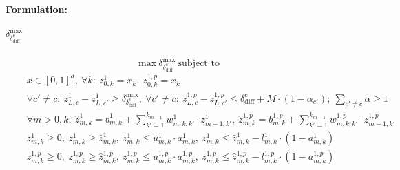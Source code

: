 \documentclass[11pt]{article}
\begin{document}
\paragraph{Formulation:}
\subparagraph{$\delta_{\delta_\text{diff}^c}^\text{max}$}
$$ \text{max}\ \delta_{\delta_\text{diff}^c}^\text{max}\ \text{subject to} $$
\begin{align*}
\tag{a}\quad & x\in{[0,1]^d},\ \forall{k}:\ z_{0,k}^1=x_k,\ {z_{0,k}^{1,p}}=x_k\\
\tag{b}\quad & \forall{c'\ne{c}}:\ {z_{L,c}^1}-{z_{L,c'}^1}\geq\delta_{\delta_\text{diff}^c}^\text{max},\   \forall{c'\ne{c}}:\ {z_{L,c}^{1,p}}-{z_{L,c'}^{1,p}}\leq{\delta_{\text{diff}}^c+M\cdot{(1-\alpha_{c'})}};\ \sum_{c'\ne{c}}{\alpha}\geq{1}\\
\tag{c}\quad &  \forall{m>0,k}:\ \hat{z}_{m,k}^1=b_{m,k}^1+\sum_{k'=1}^{k_{m-1}}{w_{m,k,k'}^1\cdot{z_{m-1,k'}^1}},\ \hat{z}_{m,k}^{1,p}=b_{m,k}^{1,p}+\sum_{k'=1}^{k_{m-1}}{w_{m,k,k'}^{1,p}\cdot{z_{m-1,k'}^{1,p}}}  \\
\tag{d}\quad & z_{m,k}^{1}\geq{0},\ z_{m,k}^{1}\geq{\hat{z}_{m,k}^{1}},\ z_{m,k}^{1}\leq{u_{m,k}^{1}\cdot{a_{m,k}^{1}}},\ z_{m,k}^{1}\leq{\hat{z}_{m,k}^{1}-l_{m,k}^{1}\cdot{(1-a_{m,k}^{1})}}\\ 
\quad & z_{m,k}^{1,p}\geq{0},\ z_{m,k}^{1,p}\geq{\hat{z}_{m,k}^{1,p}},\ z_{m,k}^{1,p}\leq{u_{m,k}^{1,p}\cdot{a_{m,k}^{1,p}}},\ z_{m,k}^{1,p}\leq{\hat{z}_{m,k}^{1,p}-l_{m,k}^{1,p}\cdot{(1-a_{m,k}^{1,p})}} 
    \\
\end{align*}
\end{document}
